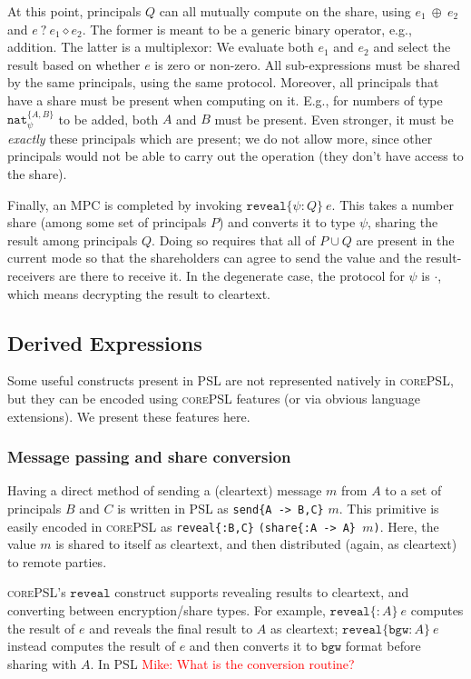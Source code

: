 \documentclass[10pt]{article}
\newcommand{\kw}[1]{\ensuremath{\mathtt{#1}}}
\newcommand{\tnat}{\ensuremath{\mathtt{nat}}}
\newcommand{\ebinop}[2]{\ensuremath{{#1}~\oplus~{#2}}}
\newcommand{\ereveal}[3]{\ensuremath{\kw{reveal}\{{#1}\!:\!{#2}\}~{#3}}}
\newcommand{\emux}[3]{\ensuremath{{#1}~\kw{?}~{#2} \diamond {#3}}}
\newcommand{\lang}{\textsc{corePSL}\xspace}
\newcommand{\mwh}[1]{\textcolor{red}{Mike: #1}}
\begin{document}
At this point, principals $Q$ can all mutually compute on the share,
using $\ebinop{e_1}{e_2}$ and $\emux{e}{e_1}{e_2}$. The former is
meant to be a generic binary operator, e.g., addition. The latter is a
multiplexor: We evaluate both $e_1$ and $e_2$ and select the result
based on whether $e$ is zero or non-zero. All sub-expressions must be
shared by the same principals, using the same protocol. Moreover, all
principals that have a share must be present when computing on
it. E.g., for numbers of type $\tnat^{\{A,B\}}_\psi$ to be added, both
$A$ and $B$ must be present. Even stronger, it must be \emph{exactly}
these principals which are present; we do not allow more, since other
principals would not be able to carry out the operation (they don't
have access to the share).

Finally, an MPC is completed by invoking $\ereveal{\psi}{Q}{e}$. This
takes a number share (among some set of principals $P$) and converts
it to type $\psi$, sharing the result among principals $Q$. Doing so
requires that all of $P \cup Q$ are present in the current mode so
that the shareholders can agree to send the value and the
result-receivers are there to receive it. In the degenerate case, the
protocol for $\psi$ is $\cdot$, which means decrypting the result to
cleartext. 

\subsection{Derived Expressions}
\label{sec:derived}

Some useful constructs present in PSL are not represented natively in
\lang, but they can be encoded using \lang features (or via
obvious language extensions). We present these features here.

\subsubsection{Message passing and share conversion}

Having a direct method of sending a (cleartext) message $m$ from $A$
to a set of principals $B$ and $C$ is written in PSL as \texttt{send\{A
    -> B,C\}} $m$. This primitive is easily encoded in \lang as
  \verb+reveal{:B,C}+ \verb+(share{:A -> A} +$m$\verb+)+.
Here, the value $m$ is shared to itself as cleartext, and then
distributed (again, as cleartext) to remote parties.

\lang's $\kw{reveal}$ construct supports revealing results to
cleartext, and converting between encryption/share types. For example,
$\ereveal{}{A}{e}$ computes the result of $e$ and reveals the final
result to $A$ as cleartext; $\ereveal{\kw{bgw}}{A}{e}$ instead
computes the result of $e$ and then converts it to $\kw{bgw}$ format
before sharing with $A$. In PSL \mwh{What is the conversion routine?}
\end{document}
